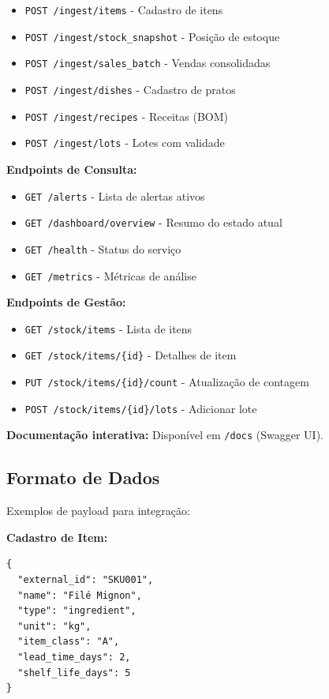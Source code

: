 \begin{itemize}[leftmargin=2em]
  \item \texttt{POST /ingest/items} - Cadastro de itens
  \item \texttt{POST /ingest/stock\_snapshot} - Posição de estoque
  \item \texttt{POST /ingest/sales\_batch} - Vendas consolidadas
  \item \texttt{POST /ingest/dishes} - Cadastro de pratos
  \item \texttt{POST /ingest/recipes} - Receitas (BOM)
  \item \texttt{POST /ingest/lots} - Lotes com validade
\end{itemize}

\textbf{Endpoints de Consulta:}

\begin{itemize}[leftmargin=2em]
  \item \texttt{GET /alerts} - Lista de alertas ativos
  \item \texttt{GET /dashboard/overview} - Resumo do estado atual
  \item \texttt{GET /health} - Status do serviço
  \item \texttt{GET /metrics} - Métricas de análise
\end{itemize}

\textbf{Endpoints de Gestão:}

\begin{itemize}[leftmargin=2em]
  \item \texttt{GET /stock/items} - Lista de itens
  \item \texttt{GET /stock/items/\{id\}} - Detalhes de item
  \item \texttt{PUT /stock/items/\{id\}/count} - Atualização de contagem
  \item \texttt{POST /stock/items/\{id\}/lots} - Adicionar lote
\end{itemize}

\textbf{Documentação interativa:} Disponível em \texttt{/docs} (Swagger UI).

\subsection{Formato de Dados}

Exemplos de payload para integração:

\textbf{Cadastro de Item:}

\begin{verbatim}
{
  "external_id": "SKU001",
  "name": "Filé Mignon",
  "type": "ingredient",
  "unit": "kg",
  "item_class": "A",
  "lead_time_days": 2,
  "shelf_life_days": 5
}
\end{verbatim}

